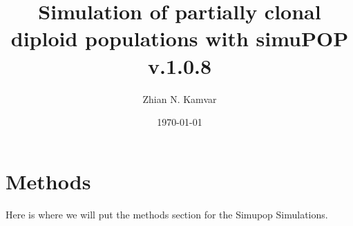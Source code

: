 \documentclass[letterpaper, draft, 10pt]{article}
\title{Simulation of partially clonal diploid populations with simuPOP v.1.0.8}
\author{Zhian N. Kamvar}
\date{\today}
\begin{document}
\maketitle
\linenumbers

\section*{Methods}
Here is where we will put the methods section for the Simupop Simulations.
\end{document}
